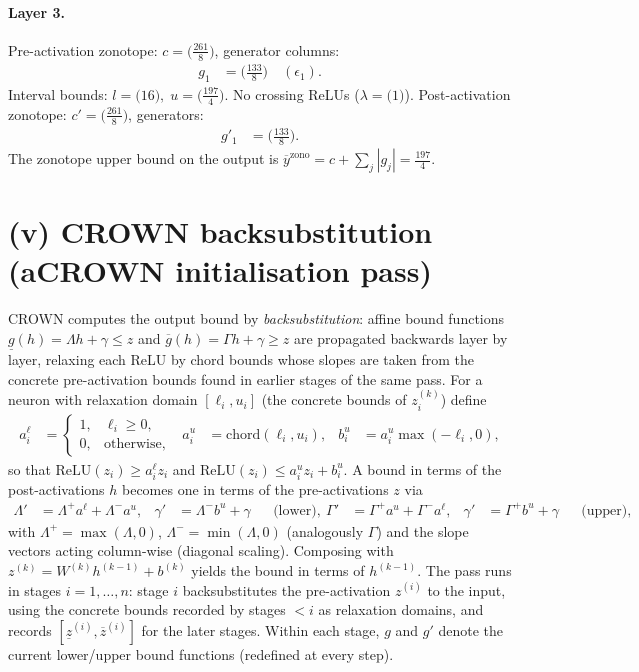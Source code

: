 \documentclass[11pt]{article}
\begin{document}
\paragraph{Layer 3.}
Pre-activation zonotope: $c = \bigl(\frac{261}{8}\bigr)$, generator columns:
\begin{align*}
g_{1} &= \bigl(\frac{133}{8}\bigr) \quad (\epsilon_{1}).
\end{align*}
Interval bounds: $l = \bigl(16\bigr), \; u = \bigl(\frac{197}{4}\bigr)$. 
No crossing ReLUs ($\lambda = \bigl(1\bigr)$).
Post-activation zonotope: $c' = \bigl(\frac{261}{8}\bigr)$, generators:
\begin{align*}
g'_{1} &= \bigl(\frac{133}{8}\bigr).
\end{align*}
The zonotope upper bound on the output is $\overline{y}^{\text{zono}} = c + \sum_j |g_j| = \frac{197}{4}$.

\section{(v) CROWN backsubstitution (aCROWN initialisation pass)}
CROWN computes the output bound by \emph{backsubstitution}: affine bound functions
$\underline{g}(h) = \Lambda h + \gamma \le z$ and $\overline{g}(h) = \Gamma h + \gamma \ge z$
are propagated backwards layer by layer, relaxing each ReLU by chord bounds whose slopes are taken
from the concrete pre-activation bounds found in earlier stages of the same pass. For a neuron with
relaxation domain $[\ell_i, u_i]$ (the concrete bounds of $z^{(k)}_i$) define
\begin{align*}
a^{\ell}_i &= \begin{cases} 1, & \ell_i \ge 0,\\ 0, & \text{otherwise}, \end{cases} & a^{u}_i &= \mathrm{chord}(\ell_i, u_i), & b^{u}_i &= a^{u}_i \max(-\ell_i, 0),
\end{align*}
so that $\mathrm{ReLU}(z_i) \ge a^{\ell}_i z_i$ and
$\mathrm{ReLU}(z_i) \le a^{u}_i z_i + b^{u}_i$. A bound in terms of the post-activations $h$ becomes
one in terms of the pre-activations $z$ via
\begin{align*}
\Lambda' &= \Lambda^{+} a^{\ell} + \Lambda^{-} a^{u}, & \gamma' &= \Lambda^{-} b^{u} + \gamma && \text{(lower)}, \
\Gamma' &= \Gamma^{+} a^{u} + \Gamma^{-} a^{\ell}, & \gamma' &= \Gamma^{+} b^{u} + \gamma && \text{(upper)},
\end{align*}
with $\Lambda^{+} = \max(\Lambda, 0)$, $\Lambda^{-} = \min(\Lambda, 0)$ (analogously $\Gamma$) and the
slope vectors acting column-wise (diagonal scaling). Composing with
$z^{(k)} = W^{(k)} h^{(k-1)} + b^{(k)}$ yields the bound in terms of $h^{(k-1)}$. The pass runs in
stages $i = 1, \dots, n$: stage $i$ backsubstitutes the pre-activation $z^{(i)}$ to the input, using
the concrete bounds recorded by stages $< i$ as relaxation domains, and records
$[\underline{z}^{(i)}, \overline{z}^{(i)}]$ for the later stages. Within each stage, $g$ and $g'$
denote the current lower/upper bound functions (redefined at every step).
\end{document}
